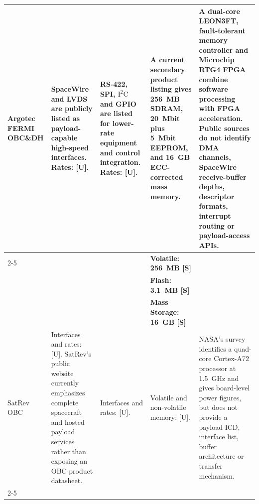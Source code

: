 \documentclass[10pt]{../datasheet}
\let\cite\citep
\begin{document}
\begin{landscape}
\begin{longtable}{|p{3.2cm}|p{4.5cm}|p{4.5cm}|p{4.5cm}|p{5.5cm}|}
    Argotec FERMI OBC\&DH \cite{argotec_fermi_ds}                      &
    SpaceWire and LVDS are publicly listed as payload-capable high-speed
    interfaces. Rates: [U].                                            & RS-422, SPI, $\text{I}^2\text{C}$ and GPIO
    are listed for lower-rate equipment and control integration. Rates: [U].
                                                                       & A current secondary product listing gives 256~MB SDRAM, 20~Mbit plus
    5~Mbit EEPROM, and 16~GB ECC-corrected mass memory.
                                                                       & A dual-core LEON3FT, fault-tolerant memory controller and Microchip RTG4
    FPGA combine software processing with FPGA acceleration. Public sources do
    not identify DMA channels, SpaceWire receive-buffer depths, descriptor
    formats, interrupt routing or payload-access APIs.
    \\
    \cline{2-5}
                                                                       &                                                                            &                                                  & \textbf{Volatile: 256~MB [S]}             & \\
                                                                       &                                                                            &                                                  & \textbf{Flash: 3.1~MB [S]}                & \\
                                                                       &                                                                            &                                                  & \textbf{Mass Storage: 16~GB [S]}          & \\ \hline\hline

    SatRev OBC \cite{satrev_space_site, nasa_soa_2023}                 &
    Interfaces and rates: [U]. SatRev's public website currently emphasizes
    complete spacecraft and hosted payload services rather than exposing an OBC
    product datasheet.                                                 & Interfaces and rates: [U].
                                                                       & Volatile and non-volatile memory: [U].
                                                                       & NASA's survey identifies a quad-core Cortex-A72 processor at 1.5~GHz and
    gives board-level power figures, but does not provide a payload ICD,
    interface list, buffer architecture or transfer mechanism.
    \\
    \cline{2-5}
                                                                       &                                                                            &                                                  &                                           & \\ \hline\hline


\end{longtable}
\end{landscape}
\end{document}
